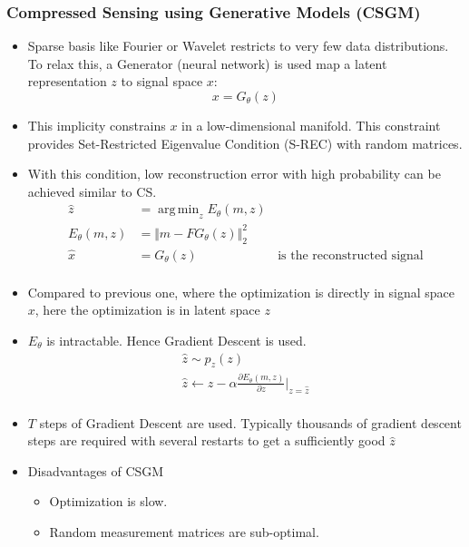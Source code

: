 \documentclass{article}
\DeclareMathOperator*{\argmin}{arg\,min}
\begin{document}
    \subsubsection{Compressed Sensing using Generative Models (CSGM)}\label{subsubsec:Deep_Compressed_Sensing:csgm}
    \begin{itemize}
        \item Sparse basis like Fourier or Wavelet restricts to very few data distributions.
        To relax this, a Generator (neural network) is used map a latent representation $z$ to signal space $x$:
        \[x = G_\theta(z)\]

        \item This implicity constrains $x$ in a low-dimensional manifold.
        This constraint provides Set-Restricted Eigenvalue Condition (S-REC) with random matrices.
        \item With this condition, low reconstruction error with high probability can be achieved similar to CS\@.
        \begin{align*}
            \hat{z} &= \argmin_z E_\theta(m,z) \\
            E_\theta(m,z) &= \Vert {m - F G_\theta(z)} \Vert_2^2 \\
            \hat{x} &= G_\theta(z) \quad \quad \quad \quad \quad \quad \textrm{ is the reconstructed signal} \\
        \end{align*}

        \item Compared to previous one, where the optimization is directly in signal space $x$, here the optimization is in latent space $z$\\
        \item $E_\theta$ is intractable.
        Hence Gradient Descent is used.
        \begin{gather*}
            \hat{z} \sim p_z(z)\\
            \hat{z} \leftarrow \hat{z}- \alpha \frac{\partial E_\theta(m,z)}{\partial z} \bigg|_{z=\hat{z}}\\
        \end{gather*}

        \item $T$ steps of Gradient Descent are used.
        Typically thousands of gradient descent steps are required with several restarts to get a sufficiently good $\hat{z}$

        \item Disadvantages of CSGM
        \begin{itemize}
            \item Optimization is slow.
            \item Random measurement matrices are sub-optimal.
        \end{itemize}
    \end{itemize}
\end{document}
